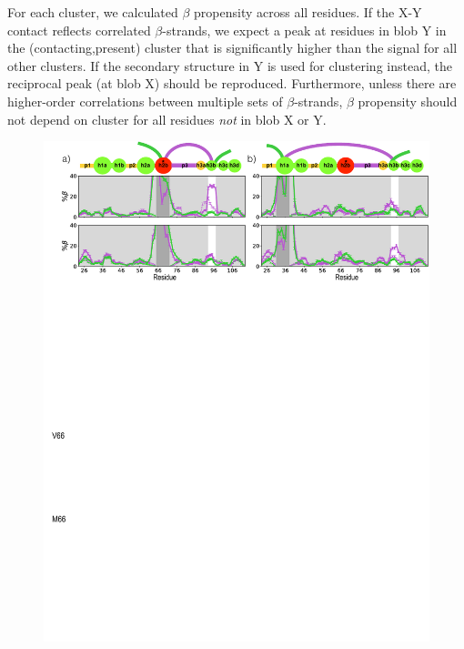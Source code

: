 \documentclass[10pt,letterpaper]{article}
\begin{document}
For each cluster, we calculated $\beta$ propensity across all residues. If the X-Y contact reflects correlated $\beta$-strands, we expect a peak at residues in blob Y in the (contacting,present) cluster that is significantly higher than the signal for all other clusters. If the secondary structure in Y is used for clustering instead, the reciprocal peak (at blob X) should be reproduced. Furthermore, unless there are higher-order correlations between multiple sets of $\beta$-strands, $\beta$ propensity should not depend on cluster for all residues \emph{not} in blob X or Y. 

\begin{figure}[!ht]
\includegraphics[scale=0.5,width=\textwidth,trim={0 0cm 0 0cm},clip]{./figures/fig6.pdf}

\end{figure}
\end{document}
